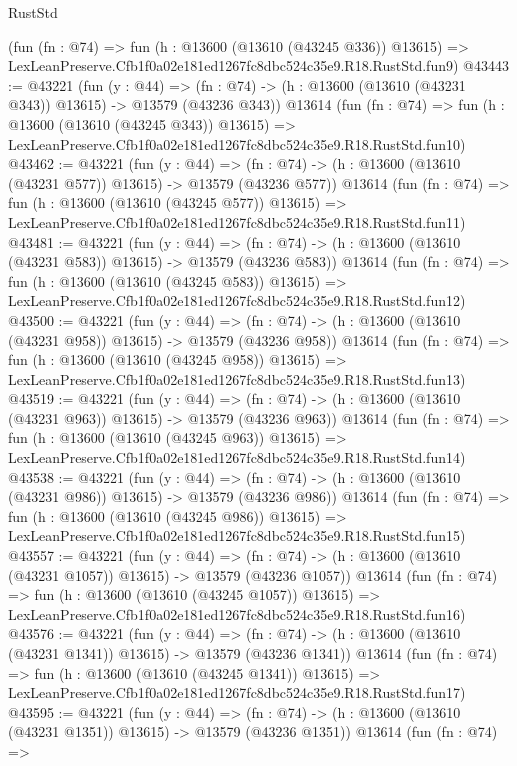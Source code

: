 \begin{lexlean}{RustStd}
\begin{coremodule}
    (fun (fn : @74) =>
    fun (h : @13600 (@13610 (@43245 @336)) @13615) =>
    LexLeanPreserve.Cfb1f0a02e181ed1267fc8dbc524c35e9.R18.RustStd.fun9)
@43443 := @43221
    (fun (y : @44) =>
    (fn : @74) -> (h : @13600 (@13610 (@43231 @343)) @13615) -> @13579 (@43236 @343))
    @13614
    (fun (fn : @74) =>
    fun (h : @13600 (@13610 (@43245 @343)) @13615) =>
    LexLeanPreserve.Cfb1f0a02e181ed1267fc8dbc524c35e9.R18.RustStd.fun10)
@43462 := @43221
    (fun (y : @44) =>
    (fn : @74) -> (h : @13600 (@13610 (@43231 @577)) @13615) -> @13579 (@43236 @577))
    @13614
    (fun (fn : @74) =>
    fun (h : @13600 (@13610 (@43245 @577)) @13615) =>
    LexLeanPreserve.Cfb1f0a02e181ed1267fc8dbc524c35e9.R18.RustStd.fun11)
@43481 := @43221
    (fun (y : @44) =>
    (fn : @74) -> (h : @13600 (@13610 (@43231 @583)) @13615) -> @13579 (@43236 @583))
    @13614
    (fun (fn : @74) =>
    fun (h : @13600 (@13610 (@43245 @583)) @13615) =>
    LexLeanPreserve.Cfb1f0a02e181ed1267fc8dbc524c35e9.R18.RustStd.fun12)
@43500 := @43221
    (fun (y : @44) =>
    (fn : @74) -> (h : @13600 (@13610 (@43231 @958)) @13615) -> @13579 (@43236 @958))
    @13614
    (fun (fn : @74) =>
    fun (h : @13600 (@13610 (@43245 @958)) @13615) =>
    LexLeanPreserve.Cfb1f0a02e181ed1267fc8dbc524c35e9.R18.RustStd.fun13)
@43519 := @43221
    (fun (y : @44) =>
    (fn : @74) -> (h : @13600 (@13610 (@43231 @963)) @13615) -> @13579 (@43236 @963))
    @13614
    (fun (fn : @74) =>
    fun (h : @13600 (@13610 (@43245 @963)) @13615) =>
    LexLeanPreserve.Cfb1f0a02e181ed1267fc8dbc524c35e9.R18.RustStd.fun14)
@43538 := @43221
    (fun (y : @44) =>
    (fn : @74) -> (h : @13600 (@13610 (@43231 @986)) @13615) -> @13579 (@43236 @986))
    @13614
    (fun (fn : @74) =>
    fun (h : @13600 (@13610 (@43245 @986)) @13615) =>
    LexLeanPreserve.Cfb1f0a02e181ed1267fc8dbc524c35e9.R18.RustStd.fun15)
@43557 := @43221
    (fun (y : @44) =>
    (fn : @74) -> (h : @13600 (@13610 (@43231 @1057)) @13615) -> @13579 (@43236 @1057))
    @13614
    (fun (fn : @74) =>
    fun (h : @13600 (@13610 (@43245 @1057)) @13615) =>
    LexLeanPreserve.Cfb1f0a02e181ed1267fc8dbc524c35e9.R18.RustStd.fun16)
@43576 := @43221
    (fun (y : @44) =>
    (fn : @74) -> (h : @13600 (@13610 (@43231 @1341)) @13615) -> @13579 (@43236 @1341))
    @13614
    (fun (fn : @74) =>
    fun (h : @13600 (@13610 (@43245 @1341)) @13615) =>
    LexLeanPreserve.Cfb1f0a02e181ed1267fc8dbc524c35e9.R18.RustStd.fun17)
@43595 := @43221
    (fun (y : @44) =>
    (fn : @74) -> (h : @13600 (@13610 (@43231 @1351)) @13615) -> @13579 (@43236 @1351))
    @13614
    (fun (fn : @74) =>

\end{coremodule}
\end{lexlean}

